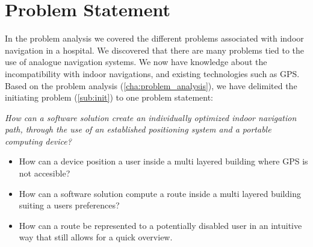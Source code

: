 \chapter{Problem Statement}




In the problem analysis we covered the different problems associated with indoor navigation in a hospital.
We discovered that there are many problems tied to the use of analogue navigation systems. We now have knowledge about the incompatibility with indoor navigations, and existing technologies such as GPS.
Based on the problem analysis (\cref{cha:problem_analysis}), we have delimited the initiating problem (\cref{sub:init}) to one problem statement:

\begin{displayquote}
    \textit{How can a software solution create an individually optimized indoor navigation path, through the use of an established positioning system and a portable computing device?}\label{sub:problem_statement}
\end{displayquote}

\begin{itemize}
	\item How can a device position a user inside a multi layered building where GPS is not accesible?
	\item How can a software solution compute a route inside a multi layered building suiting a users preferences?
	\item How can a route be represented to a potentially disabled user in an intuitive way that still allows for a quick overview.
\end{itemize}




